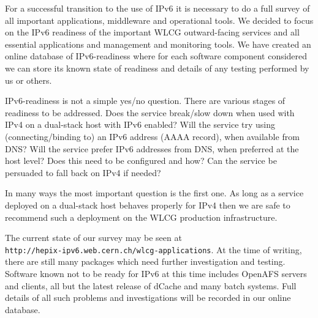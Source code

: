 For a successful transition to the use of IPv6 it is necessary to do a full survey of all important applications, middleware and operational tools. We decided to focus on the IPv6 readiness of the important WLCG outward-facing services and all essential applications and management and monitoring tools. We have created an online database of IPv6-readiness where for each software component considered we can store its known state of readiness and details of any testing performed by us or others.

IPv6-readiness is not a simple yes/no question. There are various stages of readiness to be addressed.
Does the service break/slow down when used with IPv4 on a dual-stack host with IPv6 enabled?
Will the service try using (connecting/binding to) an IPv6 address (AAAA record), when available from DNS?
Will the service prefer IPv6 addresses from DNS, when preferred at the host level?
Does this need to be configured and how?
Can the service be persuaded to fall back on IPv4 if needed?

In many ways the most important question is the first one. As long as a service deployed on a dual-stack host behaves properly for IPv4 then we are safe to recommend such a deployment on the WLCG production infrastructure.

The current state of our survey may be seen at \\
{\tt http://hepix-ipv6.web.cern.ch/wlcg-applications}.
At the time of 
writing, there are still many packages which need further investigation and testing. Software known not to be ready for IPv6 at this time includes OpenAFS servers and clients, all but the latest release of dCache and many batch systems. Full details of all such problems and investigations will be recorded in our online database.


